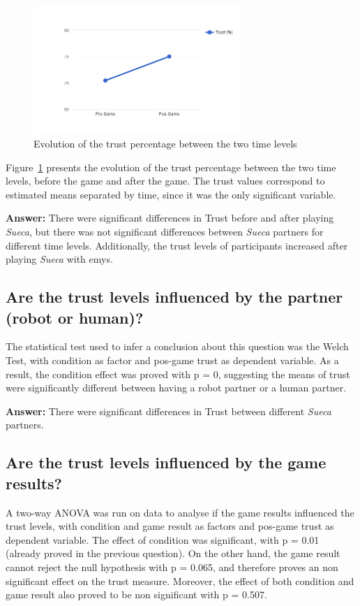 \begin{figure}[h!]
  \centering
    \includegraphics[width=0.7\textwidth]{./img/6/trustMixedANOVA}
  \caption{Evolution of the trust percentage between the two time levels}
\label{fig:trustMixedANOVA}
\end{figure}

Figure~\ref{fig:trustMixedANOVA} presents the evolution of the trust percentage between the two time levels, before the game and after the game.
The trust values correspond to estimated means separated by time, since it was the only significant variable.

\textbf{Answer:} There were significant differences in Trust before and after playing \emph{Sueca}, but there was not significant differences between \emph{Sueca} partners for different time levels.
Additionally, the trust levels of participants increased after playing \emph{Sueca} with \ac{emys}.



\subsection*{Are the trust levels influenced by the partner (robot or human)?}
The statistical test used to infer a conclusion about this question was the Welch Test, with condition as factor and pos-game trust as dependent variable.
As a result, the condition effect was proved with p = 0, suggesting the means of trust were significantly different between having a robot partner or a human partner.

\textbf{Answer:} There were significant differences in Trust between different \emph{Sueca} partners.


\subsection*{Are the trust levels influenced by the game results?}
A two-way ANOVA was run on data to analyse if the game results influenced the trust levels, with condition and game result as factors and pos-game trust as dependent variable.
The effect of condition was significant, with p = 0.01 (already proved in the previous question).
On the other hand, the game result cannot reject the null hypothesis with p = 0.065, and therefore proves an non significant effect on the trust measure.
Moreover, the effect of both condition and game result also proved to be non significant with p = 0.507.

